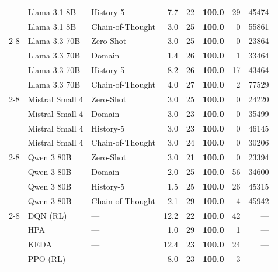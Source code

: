 \begin{table}[t]
\begin{tabular}{lllrrrrr}
 & Llama 3.1 8B & History-5 & 7.7 & 22 & \textbf{100.0} & 29 & 45474 \\
 & Llama 3.1 8B & Chain-of-Thought & 3.0 & 25 & \textbf{100.0} & 0 & 55861 \\
\cmidrule{2-8}
 & Llama 3.3 70B & Zero-Shot & 3.0 & 25 & \textbf{100.0} & 0 & 23864 \\
 & Llama 3.3 70B & Domain & 1.4 & 26 & \textbf{100.0} & 1 & 33464 \\
 & Llama 3.3 70B & History-5 & 8.2 & 26 & \textbf{100.0} & 17 & 43464 \\
 & Llama 3.3 70B & Chain-of-Thought & 4.0 & 27 & \textbf{100.0} & 2 & 77529 \\
\cmidrule{2-8}
 & Mistral Small 4 & Zero-Shot & 3.0 & 25 & \textbf{100.0} & 0 & 24220 \\
 & Mistral Small 4 & Domain & 3.0 & 23 & \textbf{100.0} & 0 & 35499 \\
 & Mistral Small 4 & History-5 & 3.0 & 23 & \textbf{100.0} & 0 & 46145 \\
 & Mistral Small 4 & Chain-of-Thought & 3.0 & 24 & \textbf{100.0} & 0 & 30206 \\
\cmidrule{2-8}
 & Qwen 3 80B & Zero-Shot & 3.0 & 21 & \textbf{100.0} & 0 & 23394 \\
 & Qwen 3 80B & Domain & 2.0 & 25 & \textbf{100.0} & 56 & 34600 \\
 & Qwen 3 80B & History-5 & 1.5 & 25 & \textbf{100.0} & 26 & 45315 \\
 & Qwen 3 80B & Chain-of-Thought & 2.1 & 29 & \textbf{100.0} & 4 & 45942 \\
\cmidrule{2-8}
 & DQN (RL) & — & 12.2 & 22 & \textbf{100.0} & 42 & — \\
 & HPA & — & 1.0 & 29 & \textbf{100.0} & 1 & — \\
 & KEDA & — & 12.4 & 23 & \textbf{100.0} & 24 & — \\
 & PPO (RL) & — & 8.0 & 23 & \textbf{100.0} & 3 & — \\
\bottomrule
\end{tabular}
\end{table}
